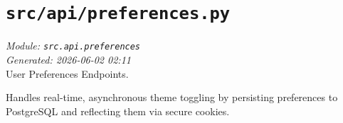 
\section{\texttt{src/api/preferences.py}}
\textit{Module: \texttt{src.api.preferences}} \\
\textit{Generated: 2026-06-02 02:11} \\

User Preferences Endpoints.

Handles real-time, asynchronous theme toggling by persisting preferences
to PostgreSQL and reflecting them via secure cookies.
